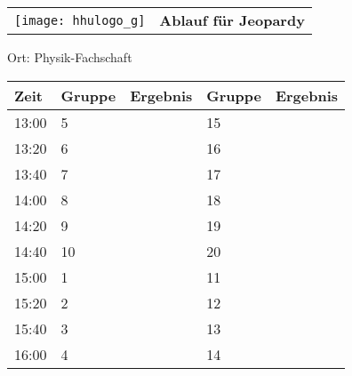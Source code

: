 \documentclass[a4paper,10pt]{article}
\def\spiele{Jeopardy}
\def\raumee{Physik-Fachschaft}
\begin{document}
   \newpage
  \begin{tabularx}{\textwidth}{lc}
    \texttt{[image: hhulogo\_g]}
  & {\Huge \textbf{Ablauf für \spiele}}
  \end{tabularx}
  \LARGE
  \begin{center}
    \vspace{1cm} 
    Ort: \raumee
  \end{center}
    \vspace{2cm} 
    \begin{tabularx}{\textwidth}{X||X|X||X|X}
	\textbf{Zeit} &\textbf{Gruppe} & \textbf{Ergebnis} &\textbf{Gruppe} & \textbf{Ergebnis}  	\\ \hline \hline
	13:00 &	5	&	&15	&	\\ \hline
	13:20 &	6	&	&16	&	\\ \hline
	13:40 &	7	&	&17	&	\\ \hline

	14:00 &	8	&	&18	&	\\ \hline
	14:20 &	9	&	&19	&	\\ \hline
	14:40 &	10	&	&20	&	\\ \hline

	15:00 &	1	&	&11	&	\\ \hline
	15:20 &	2	&	&12	&	\\ \hline
	15:40 &	3	&	&13	&	\\ \hline

	16:00 &	4	&	&14	&	\\ \hline
      
    \end{tabularx}
   
\end{document}
